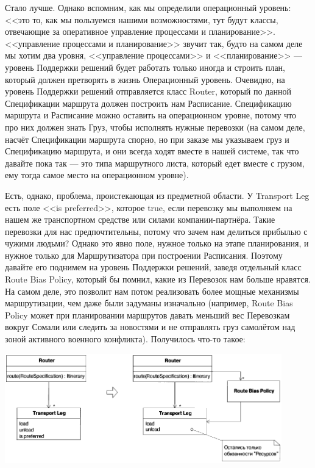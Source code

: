 \documentclass[a5paper]{article}
\begin{document}
Стало лучше. Однако вспомним, как мы определили операционный уровень: <<это то, как мы пользуемся нашими возможностями, тут будут классы, отвечающие за оперативное управление процессами и планирование>>. <<управление процессами и планирование>> звучит так, будто на самом деле мы хотим два уровня, <<управление процессами>> и <<планирование>> --- уровень Поддержки решений будет работать только иногда и строить план, который должен претворять в жизнь Операционный уровень. Очевидно, на уровень Поддержки решений отправляется класс Router, который по данной 
Спецификации маршрута должен построить нам Расписание. Спецификацию маршрута и Расписание можно оставить на операционном уровне, потому что про них должен знать Груз, чтобы исполнять нужные перевозки (на самом деле, насчёт Спецификации маршрута спорно, но при заказе мы указываем груз и Спецификацию маршрута, и они всегда ходят вместе в нашей системе, так что давайте пока так --- это типа маршрутного листа, который едет вместе с грузом, ему тогда самое место на операционном уровне).

Есть, однако, проблема, проистекающая из предметной области. У Transport Leg есть поле <<is preferred>>, которое true, если перевозку мы выполняем на нашем же транспортном средстве или силами компании-партнёра. Такие перевозки для нас предпочтительны, потому что зачем нам делиться прибылью с чужими людьми? Однако это явно поле, нужное только на этапе планирования, и нужное только для Маршрутизатора при построении Расписания. Поэтому давайте его поднимем на уровень Поддержки решений, заведя отдельный класс Route Bias Policy, который бы помнил, какие из Перевозок нам больше нравятся. На самом деле, это позволит нам потом реализовать более мощные механизмы маршрутизации, чем даже были задуманы изначально (например, Route Bias Policy может при планировании маршрутов давать меньший вес Перевозкам вокруг Сомали или следить за новостями и не отправлять груз самолётом над зоной активного военного конфликта). Получилось что-то такое:

\begin{center}
    \includegraphics[width=0.9\textwidth]{cargoThirdLayerRefactoring.png}
\end{center}
\end{document}
